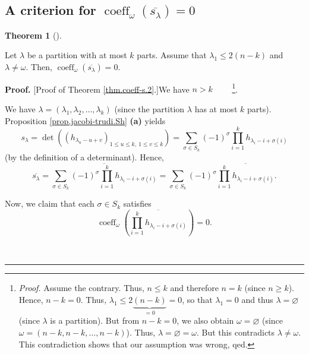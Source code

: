 \documentclass[numbers=enddot,12pt,final,onecolumn,notitlepage]{scrartcl}%
\theoremstyle{definition}
\newtheorem{theo}{Theorem}[section]
\newenvironment{theorem}[1][]
{\begin{theo}[#1]\begin{leftbar}}
{\end{leftbar}\end{theo}}
\newenvironment{proof}[1][Proof]{\noindent\textbf{#1.} }{\ \rule{0.5em}{0.5em}}
\let\sumnonlimits\sum
\let\prodnonlimits\prod
\renewcommand{\sum}{\sumnonlimits\limits}
\renewcommand{\prod}{\prodnonlimits\limits}
\begin{document}
\subsection{A criterion for $\operatorname*{coeff}\nolimits_{\omega}\left(
\overline{s_{\lambda}}\right)  =0$}

\begin{theorem}
\label{thm.coeff-s.2}Let $\lambda$ be a partition with at most $k$ parts.
Assume that $\lambda_{1}\leq2\left(  n-k\right)  $ and $\lambda\neq\omega$.
Then, $\operatorname*{coeff}\nolimits_{\omega}\left(  \overline{s_{\lambda}%
}\right)  =0$.
\end{theorem}

\begin{proof}
[Proof of Theorem \ref{thm.coeff-s.2}.]We have $n>k$%
\ \ \ \ \footnote{\textit{Proof.} Assume the contrary. Thus, $n\leq k$ and
therefore $n=k$ (since $n\geq k$). Hence, $n-k=0$. Thus, $\lambda_{1}%
\leq2\underbrace{\left(  n-k\right)  }_{=0}=0$, so that $\lambda_{1}=0$ and
thus $\lambda=\varnothing$ (since $\lambda$ is a partition). But from $n-k=0$,
we also obtain $\omega=\varnothing$ (since $\omega=\left(  n-k,n-k,\ldots
,n-k\right)  $). Thus, $\lambda=\varnothing=\omega$. But this contradicts
$\lambda\neq\omega$. This contradiction shows that our assumption was wrong,
qed.}.

We have $\lambda=\left(  \lambda_{1},\lambda_{2},\ldots,\lambda_{k}\right)  $
(since the partition $\lambda$ has at most $k$ parts). Proposition
\ref{prop.jacobi-trudi.Sh} \textbf{(a)} yields%
\[
s_{\lambda}=\det\left(  \left(  h_{\lambda_{u}-u+v}\right)  _{1\leq u\leq
k,\ 1\leq v\leq k}\right)  =\sum_{\sigma\in S_{k}}\left(  -1\right)  ^{\sigma
}\prod_{i=1}^{k}h_{\lambda_{i}-i+\sigma\left(  i\right)  }%
\]
(by the definition of a determinant). Hence,%
\begin{equation}
\overline{s_{\lambda}}=\overline{\sum_{\sigma\in S_{k}}\left(  -1\right)
^{\sigma}\prod_{i=1}^{k}h_{\lambda_{i}-i+\sigma\left(  i\right)  }}%
=\sum_{\sigma\in S_{k}}\left(  -1\right)  ^{\sigma}\overline{\prod_{i=1}%
^{k}h_{\lambda_{i}-i+\sigma\left(  i\right)  }}. \label{pf.thm.coeff-s.2.jt2}%
\end{equation}


Now, we claim that each $\sigma\in S_{k}$ satisfies%
\begin{equation}
\operatorname*{coeff}\nolimits_{\omega}\left(  \overline{\prod_{i=1}%
^{k}h_{\lambda_{i}-i+\sigma\left(  i\right)  }}\right)  =0.
\label{pf.thm.coeff-s.2.claim}%
\end{equation}



\end{proof}
\end{document}
